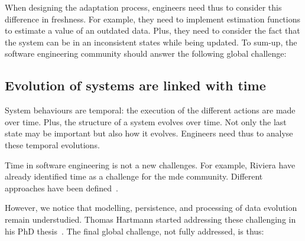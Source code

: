 When designing the adaptation process, engineers need thus to consider this difference in freshness.
For example, they need to implement estimation functions to estimate a value of an outdated data.
Plus, they need to consider the fact that the system can be in an inconsistent states while being updated.
To sum-up, the software engineering community should answer the following global challenge:
\vspace{-2em}

\subsection{Evolution of systems are linked with time}
\label{intro:challenges:evol-syst}

%
%
%


System behaviours are temporal: the execution of the different actions are made over time.
Plus, the structure of a system evolves over time.
Not only the last state may be important but also how it evolves.
Engineers need thus to analyse these temporal evolutions.

Time in software engineering is not a new challenges.
For example, Riviera \etal \cite{DBLP:conf/models/RiveraRV08} have already identified time as a challenge for the \gls{mde} community.
Different approaches have been defined~\cite{DBLP:conf/sle/BousseCCGB15, DBLP:conf/sle/KansoT12, DBLP:conf/icse/KoegelH10, DBLP:conf/seke/0001FNMKT14}.

However, we notice that modelling, persistence, and processing of data evolution remain understudied.
Thomas Hartmann started addressing these challenging in his PhD thesis~\cite{DBLP:phd/basesearch/Hartmann16}.
The final global challenge, not fully addressed, is thus:
\vspace{-2em}
